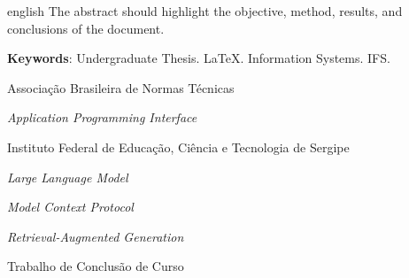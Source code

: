 \begin{resumo}[Abstract]
    \begin{otherlanguage*}{english}
        \noindent
        The abstract should highlight the objective, method, results, and conclusions of the document.
        
        \vspace{\onelineskip}
        \noindent
        \textbf{Keywords}: %
        Undergraduate Thesis. LaTeX. Information Systems. IFS.
    \end{otherlanguage*}
\end{resumo}

\begin{siglas}
    \item[ABNT] Associação Brasileira de Normas Técnicas
    \item[API] \textit{Application Programming Interface}
    \item[IFS] Instituto Federal de Educação, Ciência e Tecnologia de Sergipe
    \item[LLM] \textit{Large Language Model}
    \item[MCP] \textit{Model Context Protocol}
    \item[RAG] \textit{Retrieval-Augmented Generation}
    \item[TCC] Trabalho de Conclusão de Curso
\end{siglas}
